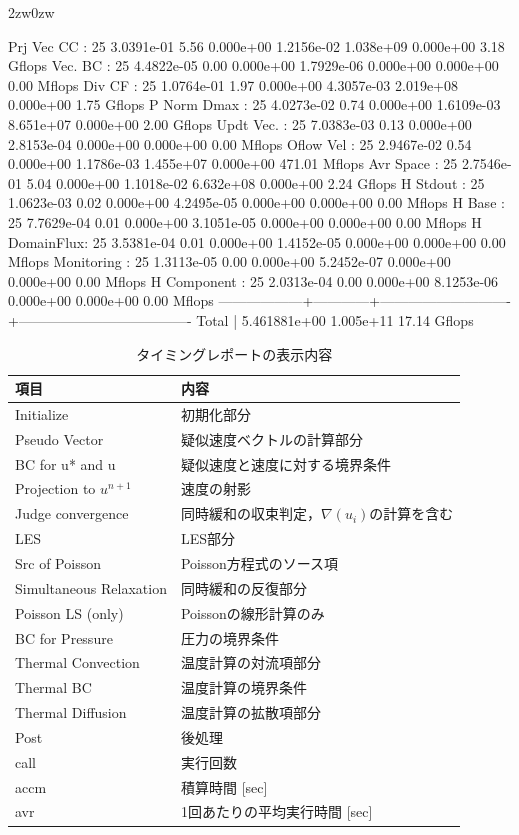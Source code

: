 \begin{indentation}{2zw}{0zw}
{\begin{program}
Prj Vec CC  :  25   3.0391e-01   5.56  0.000e+00  1.2156e-02   1.038e+09  0.000e+00    3.18 Gflops
Vec. BC     :  25   4.4822e-05   0.00  0.000e+00  1.7929e-06   0.000e+00  0.000e+00    0.00 Mflops
Div CF      :  25   1.0764e-01   1.97  0.000e+00  4.3057e-03   2.019e+08  0.000e+00    1.75 Gflops
P Norm Dmax :  25   4.0273e-02   0.74  0.000e+00  1.6109e-03   8.651e+07  0.000e+00    2.00 Gflops
Updt Vec.   :  25   7.0383e-03   0.13  0.000e+00  2.8153e-04   0.000e+00  0.000e+00    0.00 Mflops
Oflow Vel   :  25   2.9467e-02   0.54  0.000e+00  1.1786e-03   1.455e+07  0.000e+00  471.01 Mflops
Avr Space   :  25   2.7546e-01   5.04  0.000e+00  1.1018e-02   6.632e+08  0.000e+00    2.24 Gflops
H Stdout    :  25   1.0623e-03   0.02  0.000e+00  4.2495e-05   0.000e+00  0.000e+00    0.00 Mflops
H Base      :  25   7.7629e-04   0.01  0.000e+00  3.1051e-05   0.000e+00  0.000e+00    0.00 Mflops
H DomainFlux:  25   3.5381e-04   0.01  0.000e+00  1.4152e-05   0.000e+00  0.000e+00    0.00 Mflops
Monitoring  :  25   1.3113e-05   0.00  0.000e+00  5.2452e-07   0.000e+00  0.000e+00    0.00 Mflops
H Component :  25   2.0313e-04   0.00  0.000e+00  8.1253e-06   0.000e+00  0.000e+00    0.00 Mflops
------------------+------------+----------------------------+-------------------------------------
Total       |                5.461881e+00                      1.005e+11              17.14 Gflops
\end{program}
}

\begin{table}[htdp]
\caption{タイミングレポートの表示内容}
\begin{center}
\small
\begin{tabular}{ll}\toprule
項目 & 内容\\ \midrule
Initialize              & 初期化部分\\
Pseudo Vector           & 疑似速度ベクトルの計算部分\\
BC for u* and u         & 疑似速度と速度に対する境界条件\\
Projection to $u^{n+1}$ & 速度の射影\\
Judge convergence       & 同時緩和の収束判定，$\nabla (u_i)$の計算を含む\\
LES                     & LES部分\\
Src of Poisson          & Poisson方程式のソース項\\
Simultaneous Relaxation & 同時緩和の反復部分\\
Poisson LS (only)       & Poissonの線形計算のみ\\
BC for Pressure         & 圧力の境界条件\\
Thermal Convection      & 温度計算の対流項部分\\
Thermal BC              & 温度計算の境界条件\\
Thermal Diffusion       & 温度計算の拡散項部分\\
Post                    & 後処理\\ \midrule
call & 実行回数\\
accm & 積算時間 [sec]\\
avr  & 1回あたりの平均実行時間 [sec]\\ \bottomrule


\end{tabular}
\end{center}
\end{table}
\end{indentation}
